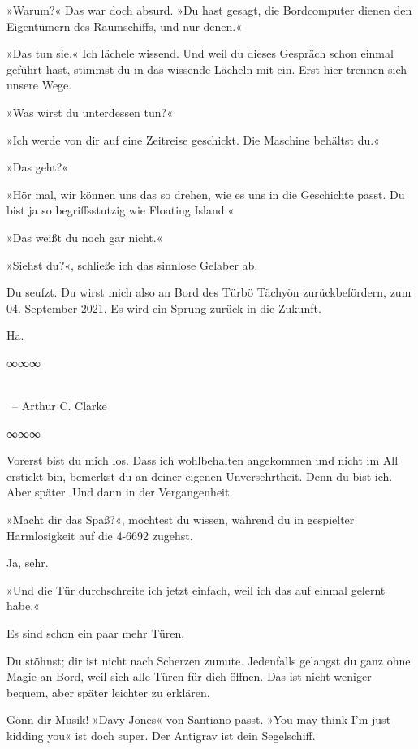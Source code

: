 »Warum?« Das war doch absurd. »Du hast gesagt, die Bordcomputer dienen den Eigentümern des Raumschiffs, und nur denen.«

»Das tun sie.« Ich lächele wissend. Und weil du dieses Gespräch schon einmal geführt hast, stimmst du in das wissende Lächeln mit ein. Erst hier trennen sich unsere Wege.

»Was wirst du unterdessen tun?«

»Ich werde von dir auf eine Zeitreise geschickt. Die Maschine behältst du.«

»Das geht?«

»Hör mal, wir können uns das so drehen, wie es uns in die Geschichte passt. Du bist ja so begriffsstutzig wie Floating Island.«

»Das weißt du noch gar nicht.«

»Siehst du?«, schließe ich das sinnlose Gelaber ab.

Du seufzt. Du wirst mich also an Bord des Türbö Tächyön zurückbefördern, zum 04. September 2021. Es wird ein Sprung zurück in die Zukunft.

Ha.

\begin{center}
∞∞∞
\end{center}

\noindent {}\\
\noindent~– Arthur C. Clarke

\begin{center}
∞∞∞
\end{center}

Vorerst bist du mich los. Dass ich wohlbehalten angekommen und nicht im All erstickt bin, bemerkst du an deiner eigenen Unversehrtheit. Denn du bist ich. Aber später. Und dann in der Vergangenheit.

»Macht dir das Spaß?«, möchtest du wissen, während du in gespielter Harmlosigkeit auf die 4-6692 zugehst.

Ja, sehr.

»Und die Tür durchschreite ich jetzt einfach, weil ich das auf einmal gelernt habe.«

Es sind schon ein paar mehr Türen.

Du stöhnst; dir ist nicht nach Scherzen zumute. Jedenfalls gelangst du ganz ohne Magie an Bord, weil sich alle Türen für dich öffnen. Das ist nicht weniger bequem, aber später leichter zu erklären.

Gönn dir Musik! »Davy Jones« von Santiano passt. »You may think I’m just kidding you« ist doch super. Der Antigrav ist dein Segelschiff.

